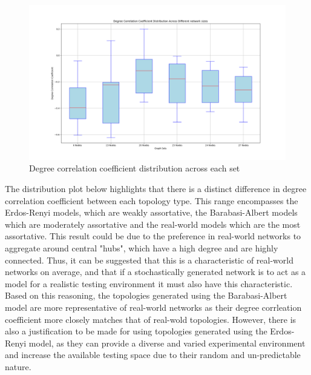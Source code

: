\begin{figure}
    \centering
    \includegraphics[width=0.9\linewidth]{images/FINAL-TOPO-COMP/Degree-coeff-distrib/Distrib-by-size.png}
    \caption{Degree correlation coefficient distribution across each set}
    \label{fig:enter-label}
\end{figure}

The distribution plot below highlights that there is a distinct difference in degree correlation coefficient between each topology type. This range encompasses the Erdos-Renyi models, which are weakly assortative, the Barabasi-Albert models which are moderately assortative and the real-world models which are the most assortative. This result could be due to the preference in real-world networks to aggregate around central "hubs", which have a high degree and are highly connected. Thus, it can be suggested that this is a characteristic of real-world networks on average, and that if a stochastically generated network is to act as a model for a realistic testing environment it must also have this characteristic. Based on this reasoning, the topologies generated using the Barabasi-Albert model are more representative of real-world networks as their degree corrleation coefficient more closely matches that of real-wold topologies. However, there is also a justification to be made for using topologies generated using the Erdos-Renyi model, as they can provide a diverse and varied experimental environment and increase the available testing space due to their random and un-predictable nature. 

